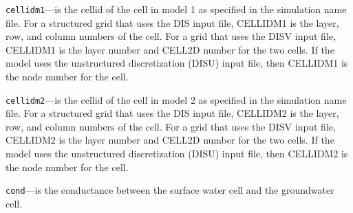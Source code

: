 \begin{description}
\item \texttt{cellidm1}---is the cellid of the cell in model 1 as specified in the simulation name file. For a structured grid that uses the DIS input file, CELLIDM1 is the layer, row, and column numbers of the cell.   For a grid that uses the DISV input file, CELLIDM1 is the layer number and CELL2D number for the two cells.  If the model uses the unstructured discretization (DISU) input file, then CELLIDM1 is the node number for the cell.

\item \texttt{cellidm2}---is the cellid of the cell in model 2 as specified in the simulation name file. For a structured grid that uses the DIS input file, CELLIDM2 is the layer, row, and column numbers of the cell.   For a grid that uses the DISV input file, CELLIDM2 is the layer number and CELL2D number for the two cells.  If the model uses the unstructured discretization (DISU) input file, then CELLIDM2 is the node number for the cell.

\item \texttt{cond}---is the conductance between the surface water cell and the groundwater cell.

\end{description}

